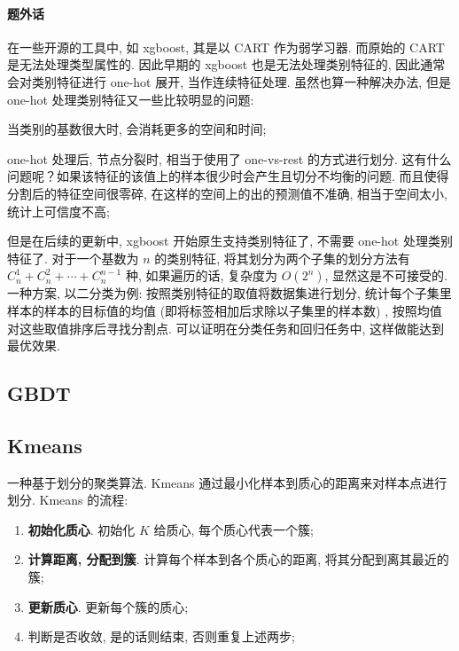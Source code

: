 \paragraph{题外话}
在一些开源的工具中, 如 xgboost, 其是以 CART 作为弱学习器. 而原始的 CART 是无法处理类型属性的. 因此早期的 xgboost 也是无法处理类别特征的, 因此通常会对类别特征进行 one-hot 展开, 当作连续特征处理. 虽然也算一种解决办法, 但是 one-hot 处理类别特征又一些比较明显的问题: 
\begin{myitemize}
	\item 当类别的基数很大时, 会消耗更多的空间和时间; 
	
	\item one-hot 处理后, 节点分裂时, 相当于使用了 one-vs-rest 的方式进行划分. 这有什么问题呢？如果该特征的该值上的样本很少时会产生且切分不均衡的问题. 而且使得分割后的特征空间很零碎, 在这样的空间上的出的预测值不准确, 相当于空间太小, 统计上可信度不高; 
\end{myitemize}

但是在后续的更新中, xgboost 开始原生支持类别特征了, 不需要 one-hot 处理类别特征了. 对于一个基数为 $n$ 的类别特征, 将其划分为两个子集的划分方法有 $C_n^1 + C_n^2 + \cdots +C_n^{n-1}$ 种, 如果遍历的话, 复杂度为 $O(2^n)$, 显然这是不可接受的. 一种方案, 以二分类为例: 按照类别特征的取值将数据集进行划分, 统计每个子集里样本的样本的目标值的均值 (即将标签相加后求除以子集里的样本数) , 按照均值对这些取值排序后寻找分割点. 可以证明在分类任务和回归任务中, 这样做能达到最优效果. 

\subsection{GBDT}


\subsection{Kmeans}
一种基于划分的聚类算法. Kmeans 通过最小化样本到质心的距离来对样本点进行划分. Kmeans 的流程:
\begin{enumerate}
	\item \textbf{初始化质心}. 初始化 $K$ 给质心, 每个质心代表一个簇;
	
	\item \textbf{计算距离, 分配到簇}. 计算每个样本到各个质心的距离, 将其分配到离其最近的簇;
	
	\item \textbf{更新质心}. 更新每个簇的质心;
	
	\item 判断是否收敛, 是的话则结束, 否则重复上述两步;
\end{enumerate}

